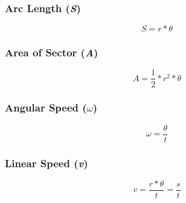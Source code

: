 \documentclass{article}
\begin{document}
	\subsubsection{Arc Length (\emph{S})}
	\begin{equation*}
		S = r * \theta
	\end{equation*}

	\subsubsection{Area of Sector (\emph{A})}
	\begin{equation*}
		A = \frac{1}{2} * r^2 * \theta
	\end{equation*}

	\subsubsection{Angular Speed ($\omega$)}
	\begin{equation*}
		\omega = \frac{\theta}{t}
	\end{equation*}

	\subsubsection{Linear Speed (\emph{v})}
	\begin{equation*}
		v = \frac{r * \theta}{t} = \frac{s}{t}
	\end{equation*}
	
\end{document}
